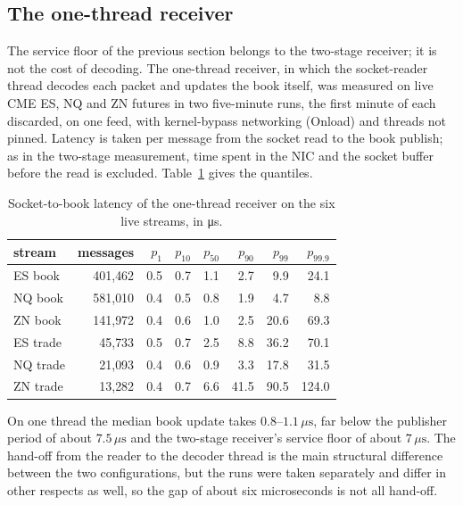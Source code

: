 \documentclass[11pt]{article}
\begin{document}
\subsection{The one-thread receiver}
\label{sec:crossval-onethread}

The service floor of the previous section belongs to the two-stage receiver; it is not the
cost of decoding. The one-thread receiver, in which the socket-reader thread decodes each
packet and updates the book itself, was measured on live CME ES, NQ and ZN futures in two
five-minute runs, the first minute of each discarded, on one feed, with kernel-bypass
networking (Onload) and threads not pinned. Latency is taken per message from the socket
read to the book publish; as in the two-stage measurement, time spent in the NIC and the
socket buffer before the read is excluded. Table~\ref{tab:crossval-onethread} gives the
quantiles.

\begin{table}[H]
\centering
\small
\begin{tabular}{@{}lrrrrrrr@{}}
\toprule
stream & messages & $p_{1}$ & $p_{10}$ & $p_{50}$ & $p_{90}$ & $p_{99}$ & $p_{99.9}$ \\
\midrule
ES book  & 401{,}462 & 0.5 & 0.7 & 1.1 & 2.7 &  9.9 &  24.1 \\
NQ book  & 581{,}010 & 0.4 & 0.5 & 0.8 & 1.9 &  4.7 &   8.8 \\
ZN book  & 141{,}972 & 0.4 & 0.6 & 1.0 & 2.5 & 20.6 &  69.3 \\
ES trade &  45{,}733 & 0.5 & 0.7 & 2.5 & 8.8 & 36.2 &  70.1 \\
NQ trade &  21{,}093 & 0.4 & 0.6 & 0.9 & 3.3 & 17.8 &  31.5 \\
ZN trade &  13{,}282 & 0.4 & 0.7 & 6.6 & 41.5 & 90.5 & 124.0 \\
\bottomrule
\end{tabular}
\caption{Socket-to-book latency of the one-thread receiver on the six live streams, in
\si{\micro\second}.}
\label{tab:crossval-onethread}
\end{table}

On one thread the median book update takes $0.8$--$1.1\,\mu\mathrm{s}$, far below the
publisher period of about $7.5\,\mu\mathrm{s}$ and the two-stage receiver's service floor of
about $7\,\mu\mathrm{s}$. The hand-off from the reader to the decoder thread is the main
structural difference between the two configurations, but the runs were taken separately
and differ in other respects as well, so the gap of about six microseconds is not all
hand-off.
\end{document}
